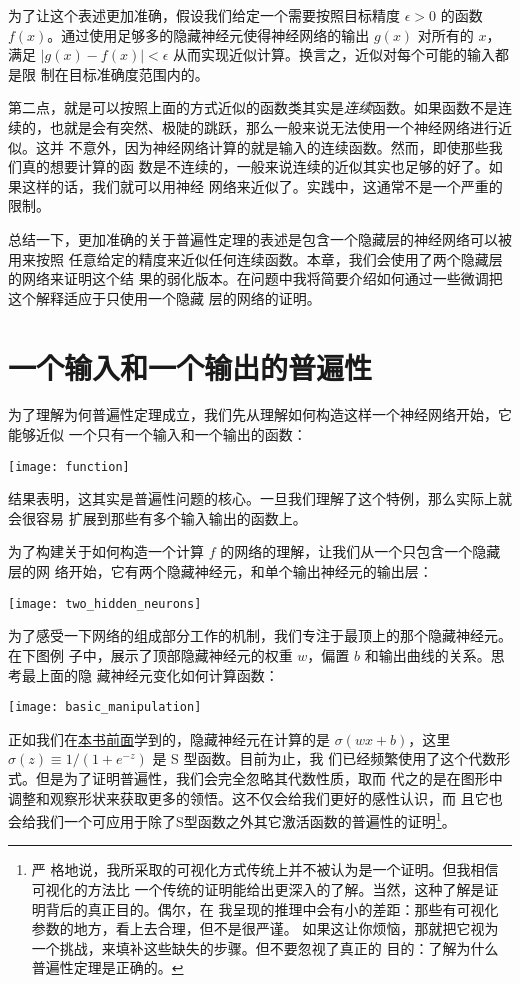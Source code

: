 为了让这个表述更加准确，假设我们给定一个需要按照目标精度 $\epsilon > 0$ 的函数
$f(x)$。通过使用足够多的隐藏神经元使得神经网络的输出 $g(x)$ 对所有的 $x$，满足
$|g(x) - f(x)| < \epsilon$ 从而实现近似计算。换言之，近似对每个可能的输入都是限
制在目标准确度范围内的。

第二点，就是可以按照上面的方式近似的函数类其实是\emph{连续}函数。如果函数不是连
续的，也就是会有突然、极陡的跳跃，那么一般来说无法使用一个神经网络进行近似。这并
不意外，因为神经网络计算的就是输入的连续函数。然而，即使那些我们真的想要计算的函
数是不连续的，一般来说连续的近似其实也足够的好了。如果这样的话，我们就可以用神经
网络来近似了。实践中，这通常不是一个严重的限制。

总结一下，更加准确的关于普遍性定理的表述是包含一个隐藏层的神经网络可以被用来按照
任意给定的精度来近似任何连续函数。本章，我们会使用了两个隐藏层的网络来证明这个结
果的弱化版本。在问题中我将简要介绍如何通过一些微调把这个解释适应于只使用一个隐藏
层的网络的证明。

\section{一个输入和一个输出的普遍性}
\label{sec:universality_with_one_input_and_one_output}

为了理解为何普遍性定理成立，我们先从理解如何构造这样一个神经网络开始，它能够近似
一个只有一个输入和一个输出的函数：
\begin{center}
  \texttt{[image: function]}
\end{center}

结果表明，这其实是普遍性问题的核心。一旦我们理解了这个特例，那么实际上就会很容易
扩展到那些有多个输入输出的函数上。

为了构建关于如何构造一个计算 $f$ 的网络的理解，让我们从一个只包含一个隐藏层的网
络开始，它有两个隐藏神经元，和单个输出神经元的输出层：
\begin{center}
  \texttt{[image: two\_hidden\_neurons]}
\end{center}

为了感受一下网络的组成部分工作的机制，我们专注于最顶上的那个隐藏神经元。在下图例
子中，展示了顶部隐藏神经元的权重 $w$，偏置 $b$ 和输出曲线的关系。思考最上面的隐
藏神经元变化如何计算函数：
\begin{center}
  \texttt{[image: basic\_manipulation]}
\end{center}

正如我们在\hyperref[sec:sigmoid_neurons]{本书前面}学到的，隐藏神经元在计算的是
$\sigma(wx + b)$，这里 $\sigma(z) \equiv 1/(1+e^{-z})$ 是 S 型函数。目前为止，我
们已经频繁使用了这个代数形式。但是为了证明普遍性，我们会完全忽略其代数性质，取而
代之的是在图形中调整和观察形状来获取更多的领悟。这不仅会给我们更好的感性认识，而
且它也会给我们一个可应用于除了S型函数之外其它激活函数的普遍性的证明\footnote{严
  格地说，我所采取的可视化方式传统上并不被认为是一个证明。但我相信可视化的方法比
  一个传统的证明能给出更深入的了解。当然，这种了解是证明背后的真正目的。偶尔，在
  我呈现的推理中会有小的差距：那些有可视化参数的地方，看上去合理，但不是很严谨。
  如果这让你烦恼，那就把它视为一个挑战，来填补这些缺失的步骤。但不要忽视了真正的
  目的：了解为什么普遍性定理是正确的。}。

